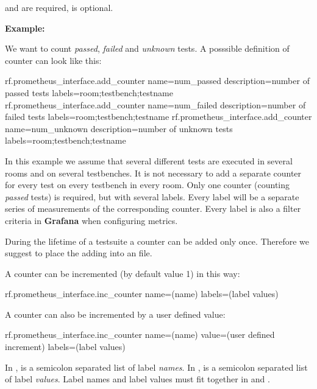  and  are required,  is optional.

\vspace{2ex}

\textbf{Example:}

We want to count \textit{passed}, \textit{failed} and \textit{unknown} tests. A posssible definition of counter can look like this:

\begin{robotcode}
rf.prometheus_interface.add_counter    name=num_passed     description=number of passed tests     labels=room;testbench;testname
rf.prometheus_interface.add_counter    name=num_failed     description=number of failed tests     labels=room;testbench;testname
rf.prometheus_interface.add_counter    name=num_unknown    description=number of unknown tests    labels=room;testbench;testname
\end{robotcode}

In this example we assume that several different tests are executed in several rooms and on several testbenches. It is not necessary to add
a separate counter for every test on every testbench in every room. Only one counter (counting \textit{passed} tests) is required,
but with several labels. Every label will be a separate series of measurements of the corresponding counter. Every label is also a filter criteria
in \textbf{Grafana} when configuring metrics.

During the lifetime of a testsuite a counter can be added only once. Therefore we suggest to place the adding into an  file.

\vspace{2ex}

A counter can be incremented (by default value 1) in this way:

\begin{robotcode}
rf.prometheus_interface.inc_counter    name=(name)     labels=(label values)
\end{robotcode}

\vspace{2ex}

A counter can also be incremented by a user defined value:

\begin{robotcode}
rf.prometheus_interface.inc_counter    name=(name)     value=(user defined increment)     labels=(label values)
\end{robotcode}

In ,  is a semicolon separated list of label \textit{names}. In ,  is
a semicolon separated list of label \textit{values}. Label names and label values must fit together in  and .

